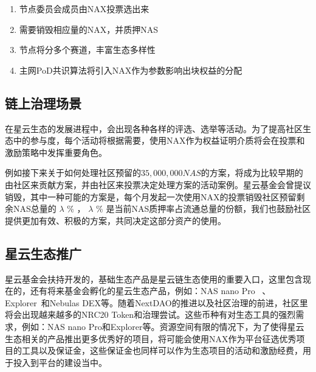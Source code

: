 \begin{enumerate}[\hspace{1cm}(a)]
  \item 节点委员会成员由NAX投票选出来
  \item 需要销毁相应量的NAX，并质押NAS
  \item 节点将分多个赛道，丰富生态多样性
  \item 主网PoD共识算法将引入NAX作为参数影响出块权益的分配
\end{enumerate}

\subsection{链上治理场景}
在星云生态的发展进程中，会出现各种各样的评选、选举等活动。为了提高社区生态中的参与度，每个活动将根据需要，使用NAX作为权益证明介质将会在投票和激励策略中发挥重要角色。

例如接下来关于如何处理社区预留的$35,000,000NAS$的方案，将成为比较早期的由社区来贡献方案，并由社区来投票决定处理方案的活动案例。星云基金会曾提议销毁，其中一种可能的方案是，每个月发起一次使用NAX的投票销毁社区预留剩余NAS总量的 \(\lambda\) \% ， \(\lambda\) \% 是当前NAS质押率占流通总量的份额，我们也鼓励社区提供更加有效、积极的方案，共同决定这部分资产的使用。

\subsection{星云生态推广}
星云基金会扶持开发的，基础生态产品是星云链生态使用的重要入口，这里包含现在的，还有将来基金会孵化的星云生态产品，例如：NAS nano Pro~\cite{NASnano} 、Explorer~\cite{explorer}和Nebulas DEX等。随着NextDAO的推进以及社区治理的前进，社区里将会出现越来越多的NRC20 Token和治理尝试。这些币种有对生态工具的强烈需求，例如：NAS nano Pro和Explorer等。资源空间有限的情况下，为了使得星云生态相关的产品推出更多优秀好的项目，将可能会使用NAX作为平台征选优秀项目的工具以及保证金，这些保证金也同样可以作为生态项目的活动和激励经费，用于投入到平台的建设当中。
